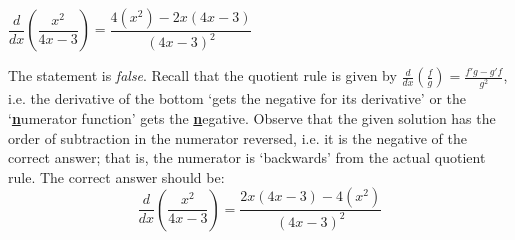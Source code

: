 \documentclass[11pt,letterpaper]{article}
\begin{document}
 $\dfrac{d}{dx} \left( \dfrac{x^2}{4x - 3} \right)= \dfrac{4(x^2) - 2x(4x - 3)}{(4x - 3)^2}$ \pspace

\sol The statement is \textit{false}. Recall that the quotient rule is given by $\frac{d}{dx} \left( \frac{f}{g} \right)= \frac{f' g - g' f}{g^2}$, i.e. the derivative of the bottom `gets the negative for its derivative' or the `\textbf{\underline{n}}umerator function' gets the \textbf{\underline{n}}egative. Observe that the given solution has the order of subtraction in the numerator reversed, i.e. it is the negative of the correct answer; that is, the numerator is `backwards' from the actual quotient rule. The correct answer should be:
	\[
	\dfrac{d}{dx} \left( \dfrac{x^2}{4x - 3} \right)= \dfrac{2x(4x - 3) - 4(x^2)}{(4x - 3)^2}
	\]
\end{document}
